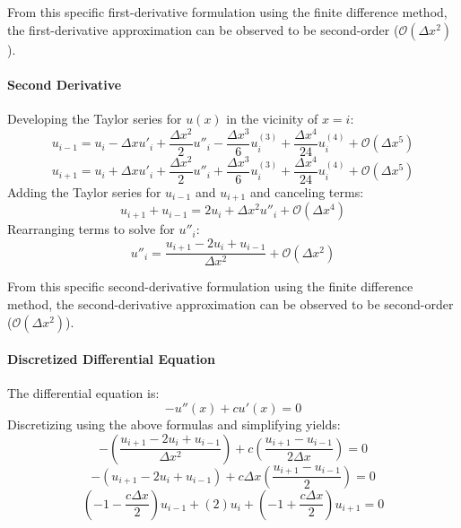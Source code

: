 \documentclass[10pt]{article}		%
\numberwithin{equation}{section}
\begin{document}
From this specific first-derivative formulation using the finite difference method, the first-derivative approximation can be observed to be second-order ($\mathcal{O}(\Delta x^2)$).

\paragraph{Second Derivative}
Developing the Taylor series for $u(x)$ in the vicinity of $x = i$:
\begin{equation}
u_{i-1} = u_i - \Delta x u'_i + \frac{\Delta x^2}{2} u''_i - \frac{\Delta x^3}{6} u^{(3)}_i + \frac{\Delta x^4}{24} u^{(4)}_i + \mathcal{O}(\Delta x^5)
\end{equation}
\begin{equation}
u_{i+1} = u_i + \Delta x u'_i + \frac{\Delta x^2}{2} u''_i + \frac{\Delta x^3}{6} u^{(3)}_i + \frac{\Delta x^4}{24} u^{(4)}_i + \mathcal{O}(\Delta x^5)
\end{equation}
Adding the Taylor series for $u_{i-1}$ and $u_{i+1}$ and canceling terms:
\begin{equation}
u_{i+1} + u_{i-1} = 2u_i + \Delta x^2 u''_i + \mathcal{O}(\Delta x^4)
\end{equation}
Rearranging terms to solve for $u''_i$:
\begin{equation}
u''_i = \frac{u_{i+1} - 2u_i + u_{i-1}}{\Delta x^2} + \mathcal{O}(\Delta x^2) 
\end{equation}

From this specific second-derivative formulation using the finite difference method, the second-derivative approximation can be observed to be second-order ($\mathcal{O}(\Delta x^2)$).

\paragraph{Discretized Differential Equation}
The differential equation is:
\begin{equation}
- u''(x)+cu'(x)=0
\end{equation}
Discretizing using the above formulas and simplifying yields:
\begin{equation}
-\left(\frac{u_{i+1} - 2u_i + u_{i-1}}{\Delta x^2}\right) + c\left(\frac{u_{i+1} - u_{i-1}}{2 \Delta x}\right) = 0
\end{equation}
\begin{equation}
-\left(u_{i+1} - 2u_i + u_{i-1}\right) + c\Delta x\left( \frac{u_{i+1} - u_{i-1}}{2}\right) = 0
\end{equation}
\begin{equation}
\left(-1-\frac{c\Delta x}{2}\right)u_{i-1} + \left(2\right)u_{i} + \left(-1+\frac{c\Delta x}{2}\right)u_{i+1} = 0
\end{equation}
\end{document}
